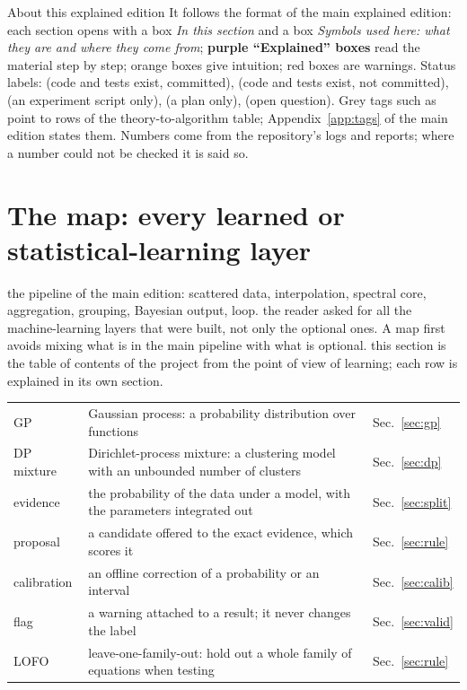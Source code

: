 \tableofcontents

\begin{notebox}{About this explained edition}
It follows the format of the main explained edition: each section opens with a box \emph{In this section} and a box \emph{Symbols used here: what they are and where they come from}; \textbf{purple ``Explained'' boxes} read the material step by step; orange boxes give intuition; red boxes are warnings. Status labels: \impl{} (code and tests exist, committed), \implu{} (code and tests exist, not committed), \proto{} (an experiment script only), \plan{} (a plan only), \openq{} (open question). Grey tags such as  point to rows of the theory-to-algorithm table; Appendix~\ref{app:tags} of the main edition states them. Numbers come from the repository's logs and reports; where a number could not be checked it is said so.
\end{notebox}
\bigskip

\section{The map: every learned or statistical-learning layer}\label{sec:map}
\sectionbrief
{the pipeline of the main edition: scattered data, interpolation, spectral core, aggregation, grouping, Bayesian output, loop.}
{the reader asked for all the machine-learning layers that were built, not only the optional ones. A map first avoids mixing what is in the main pipeline with what is optional.}
{this section is the table of contents of the project from the point of view of learning; each row is explained in its own section.}

\begin{symbols}
\begin{tabular}{@{}L{2.6cm}L{6.0cm}L{4.3cm}@{}}
GP & Gaussian process: a probability distribution over functions & Sec.~\ref{sec:gp}\\
DP mixture & Dirichlet-process mixture: a clustering model with an unbounded number of clusters & Sec.~\ref{sec:dp}\\
evidence & the probability of the data under a model, with the parameters integrated out & Sec.~\ref{sec:split}\\
proposal & a candidate offered to the exact evidence, which scores it & Sec.~\ref{sec:rule}\\
calibration & an offline correction of a probability or an interval & Sec.~\ref{sec:calib}\\
flag & a warning attached to a result; it never changes the label & Sec.~\ref{sec:valid}\\
LOFO & leave-one-family-out: hold out a whole family of equations when testing & Sec.~\ref{sec:rule}\\
\end{tabular}
\end{symbols}

